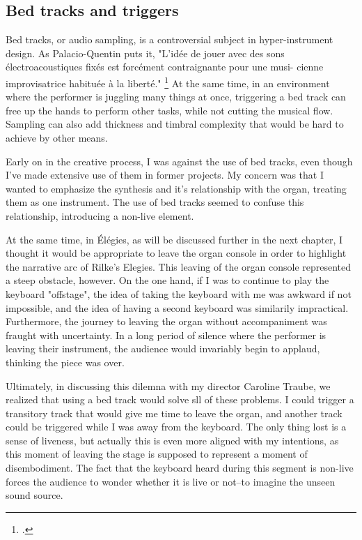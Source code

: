\documentclass[12pt,twoside,maitrise]{dms_ks}
\theoremstyle{definition}
\begin{document}
\subsection{Bed tracks and triggers}

Bed tracks, or audio sampling, is a controversial subject in hyper-instrument design.
As Palacio-Quentin puts it, "L’idée de jouer avec des sons électroacoustiques fixés est forcément contraignante pour une musi- cienne improvisatrice habituée à la liberté." \footcite[50]{palacio-quintin_composition_2012-1}
At the same time, in an environment where the performer is juggling many things at once, triggering a bed track can free up the hands to perform other tasks, while not cutting the musical flow. 
Sampling can also add thickness and timbral complexity that would be hard to achieve by other means. 

Early on in the creative process, I was against the use of bed tracks, even though I've made extensive use of them in former projects. 
My concern was that I wanted to emphasize the synthesis and it's relationship with the organ, treating them as one instrument. 
The use of bed tracks seemed to confuse this relationship, introducing a non-live element.

At the same time, in Élégies, as will be discussed further in the next chapter, I thought it would be appropriate to leave the organ console in order to highlight the narrative arc of Rilke's Elegies. 
This leaving of the organ console represented a steep obstacle, however. 
On the one hand, if I was to continue to play the keyboard "offstage", the idea of taking the keyboard with me was awkward if not impossible, and the idea of having a second keyboard was similarily impractical. 
Furthermore, the journey to leaving the organ without accompaniment was fraught with uncertainty. 
In a long period of silence where the performer is leaving their instrument, the audience would invariably begin to applaud, thinking the piece was over.

Ultimately, in discussing this dilemna with my director Caroline Traube, we realized that using a bed track would solve sll of these problems. 
I could trigger a transitory track that would give me time to leave the organ, and another track could be triggered while I was away from the keyboard. 
The only thing lost is a sense of liveness, but actually this is even more aligned with my intentions, as this moment of leaving the stage is supposed to represent a moment of disembodiment. 
The fact that the keyboard heard during this segment is non-live forces the audience to wonder whether it is live or not--to imagine the unseen sound source. 
\end{document}
